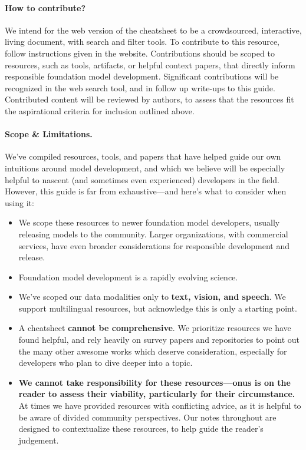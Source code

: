 \paragraph{How to contribute?}
We intend for the web version of the cheatsheet to be a crowdsourced, interactive, living document, with search and filter tools.
To contribute to this resource, follow instructions given in the website.
Contributions should be scoped to resources, such as tools, artifacts, or helpful context papers, that directly inform responsible foundation model development.
Significant contributions will be recognized in the web search tool, and in follow up write-ups to this guide.
Contributed content will be reviewed by authors, to assess that the resources fit the aspirational criteria for inclusion outlined above.

\paragraph{Scope \& Limitations.} 
We've compiled resources, tools, and papers that have helped guide our own intuitions around model development, and which we believe will be especially helpful to nascent (and sometimes even experienced) developers in the field.
However, this guide is far from exhaustive---and here's what to consider when using it:

\begin{itemize} %
    \item We scope these resources to newer foundation model developers, usually releasing models to the community. Larger organizations, with commercial services, have even broader considerations for responsible development and release.
    \item Foundation model development is a rapidly evolving science. %
    \item We've scoped our data modalities only to \textbf{text, vision, and speech}. 
    We support multilingual resources, but acknowledge this is only a starting point.
    \item A cheatsheet \textbf{cannot be comprehensive}. We prioritize resources we have found helpful, and rely heavily on survey papers and repositories to point out the many other awesome works which deserve consideration, especially for developers who plan to dive deeper into a topic.
    \item \textbf{We cannot take responsibility for these resources---onus is on the reader to assess their viability, particularly for their circumstance.} At times we have provided resources with conflicting advice, as it is helpful to be aware of divided community perspectives. Our notes throughout are designed to contextualize these resources, to help guide the reader's judgement.
\end{itemize}

